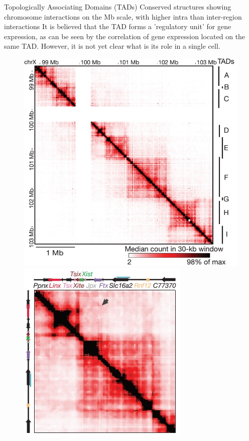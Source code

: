\documentclass[8pt]{beamer}
\begin{document}
\begin{frame}{Topologically Associating Domains (TADs)}
Conserved structures showing chromosome interactions on the Mb scale, with higher intra than inter-region interactions
It is believed that the TAD forms a 'regulatory unit' for gene expression, as can be seen by the correlation of gene expression located on the same TAD.
However, it is not yet clear what is its role in a single cell.
\centering
\begin{figure}[H]
\includegraphics[scale=0.2]{TADsOfTheXChromosome_NoraEtAl2012}
\quad
\includegraphics[scale=0.25]{TadDandENoraEtAl2012} 

\end{figure}
\end{frame}
\end{document}
